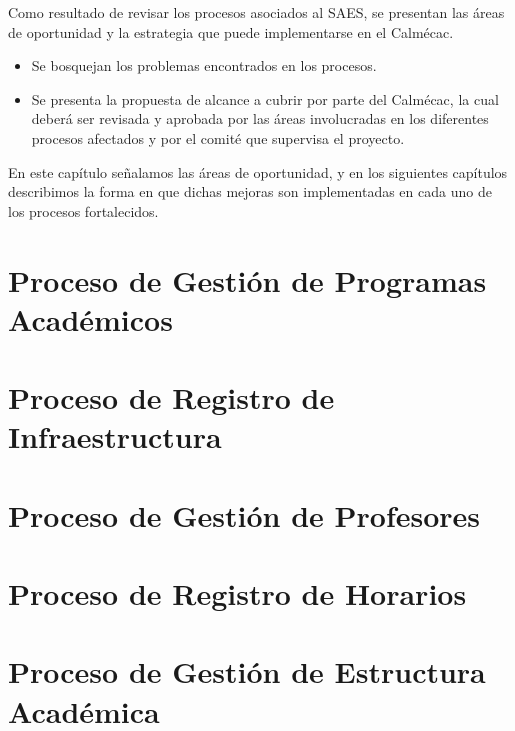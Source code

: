 	Como resultado de revisar los procesos asociados al SAES, se presentan las áreas de oportunidad y la estrategia que puede implementarse en el Calmécac.
	
	\begin{itemize}
	    \item Se bosquejan los problemas encontrados en los procesos.
	    \item Se presenta la propuesta de alcance a cubrir por parte del Calmécac, la cual deberá ser revisada y aprobada por las áreas involucradas en los diferentes procesos afectados y por el comité que supervisa el proyecto.
	\end{itemize}

	En este capítulo señalamos las áreas de oportunidad, y en los siguientes capítulos describimos la forma en que dichas mejoras son implementadas en cada uno de los procesos fortalecidos.

\section{Proceso de Gestión de Programas Académicos}


\section{Proceso de Registro de Infraestructura}


\section{Proceso de Gestión de Profesores}


\section{Proceso de Registro de Horarios}


\section{Proceso de Gestión de Estructura Académica}





